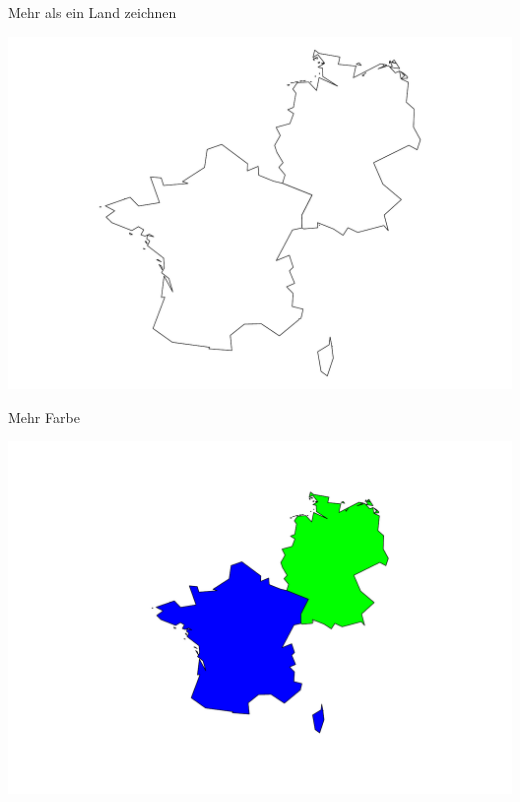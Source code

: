 \documentclass[ignorenonframetext,]{beamer}
\begin{document}
\begin{frame}{Mehr als ein Land zeichnen}

\includegraphics{Geomedizin_files/figure-beamer/unnamed-chunk-93-1.pdf}

\end{frame}

\begin{frame}{Mehr Farbe}

\includegraphics{Geomedizin_files/figure-beamer/unnamed-chunk-94-1.pdf}

\end{frame}
\end{document}
